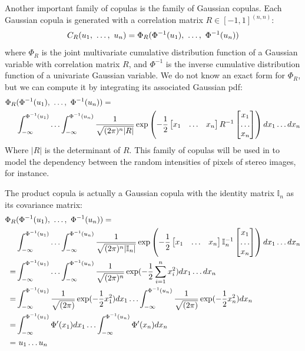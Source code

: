 Another important family of copulas is the family of Gaussian copulas. Each Gaussian copula is generated with a correlation matrix $R\in[-1,1]^{(n,n)}$:
\begin{align}
    C_R(u_1, ~\ldots, ~ u_n)=\Phi_R(\Phi^{-1}(u_1), ~\ldots, ~ \Phi^{-1}(u_n))
\end{align} where $\Phi_R$ is the joint multivariate cumulative distribution function of a Gaussian variable with correlation matrix $R$, and $\Phi^{-1}$ is the inverse cumulative distribution function of a univariate Gaussian variable. We do not know an exact form for $\Phi_R$, but we can compute it by integrating its associated Gaussian \acrshort{pdf}:
\begin{align}
   \Phi_R&(\Phi^{-1}(u_1), ~\ldots, ~ \Phi^{-1}(u_n)) =\nonumber\\ &\int_{-\infty}^{\Phi^{-1}(u_1)}\ldots\int_{-\infty}^{\Phi^{-1}(u_n)}\frac{1}{\sqrt{(2\pi)^{n}|R|}}\exp\left(-\frac{1}{2}\begin{bmatrix}x_1 & \ldots & x_{n}\end{bmatrix}R^{-1}\begin{bmatrix}x_1 \\ \ldots \\ x_{n}\end{bmatrix}\right)dx_1\ldots dx_n
\end{align}
Where $|R|$ is the determinant of $R$. This family of copulas will be used in  to model the dependency between the random intensities of pixels of stereo images, for instance. 
\begin{remark}
    The product copula is actually a Gaussian copula with the identity matrix $\mathbb{I}_n$ as its covariance matrix:
    \begin{align*}
        \Phi_R&(\Phi^{-1}(u_1), ~\ldots, ~ \Phi^{-1}(u_n)) =\\ &\int_{-\infty}^{\Phi^{-1}(u_1)}\ldots\int_{-\infty}^{\Phi^{-1}(u_n)}\frac{1}{\sqrt{(2\pi)^{n}|\mathbb{I}_n|}}\exp\left(-\frac{1}{2}\begin{bmatrix}x_1 & \ldots & x_{n}\end{bmatrix}\mathbb{I}_n^{-1}\begin{bmatrix}x_1 \\ \ldots \\ x_{n}\end{bmatrix}\right)dx_1\ldots dx_n\\
        =& \int_{-\infty}^{\Phi^{-1}(u_1)}\ldots\int_{-\infty}^{\Phi^{-1}(u_n)}\frac{1}{\sqrt{(2\pi)^{n}}}\exp(-\frac{1}{2}\sum_{i=1}^nx_i^2)dx_1\ldots dx_n\\
        =& \int_{-\infty}^{\Phi^{-1}(u_1)}\frac{1}{\sqrt{(2\pi)}}\exp(-\frac{1}{2}x_1^2)dx_1\ldots\int_{-\infty}^{\Phi^{-1}(u_n)}\frac{1}{\sqrt{(2\pi)}}\exp(-\frac{1}{2}x_n^2)dx_n\\
        =& \int_{-\infty}^{\Phi^{-1}(u_1)}\Phi'(x_1)dx_1\ldots\int_{-\infty}^{\Phi^{-1}(u_n)}\Phi'(x_n)dx_n\\
        =& ~u_1\ldots u_n
    \end{align*}
\end{remark}

